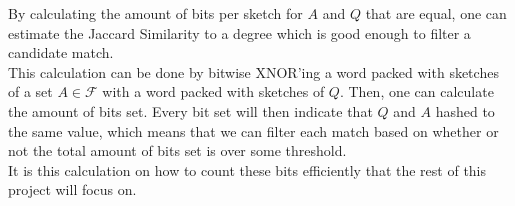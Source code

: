 By calculating the amount of bits per sketch for $A$ and $Q$ that are equal, one can estimate the Jaccard Similarity to a degree which is good enough to filter a candidate match.\\
This calculation can be done by bitwise XNOR'ing a word packed with sketches of a set $A\in \mathcal{F}$ with a word packed with sketches of $Q$. Then, one can calculate the amount of bits set. Every bit set will then indicate that $Q$ and $A$ hashed to the same value, which means that we can filter each match based on whether or not the total amount of bits set is over some threshold.\\
It is this calculation on how to count these bits efficiently that the rest of this project will focus on.
